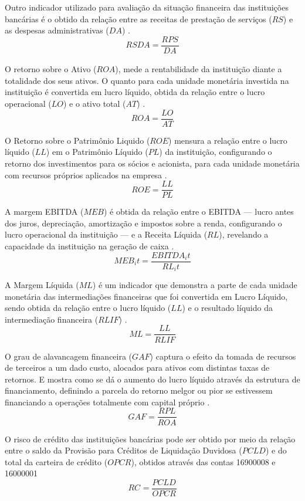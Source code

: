 \documentclass[12pt,12pt,openright,oneside,a4paper,chapter=TITLE,section=TITLE,subsection=TITLE,subsubsection=TITLE,english,french,spanish,portugues,sumario=tradicional]{abntex2}
\begin{document}
Outro indicador utilizado para avaliação da situação financeira das instituições bancárias é o obtido da relação entre as receitas de prestação de serviços (\(RS\)) e as despesas administrativas (\(DA\)) \cite{dantas:2012}.
\[
RSDA = \frac{RPS_{}}{DA_{}}
\]

O retorno sobre o Ativo (\(ROA\)), mede a rentabilidade da instituição diante a totalidade dos seus ativos. O quanto para cada unidade monetária investida na instituição é convertida em lucro líquido, obtida da relação entre o lucro operacional (\(LO\)) e o ativo total (\(AT\)) \cite{assaf:2020}.\\
\[
ROA = \frac{LO}{AT}
\]

O Retorno sobre o Patrimônio Liquido (\(ROE\)) mensura a relação entre o lucro líquido (\(LL\)) em o Patrimônio Líquido (\(PL\)) da instituição, configurando o retorno dos investimentos para os sócios e acionista, para cada unidade monetária com recursos próprios aplicados na empresa \cite{assaf:2020}.\\
\[
ROE = \frac{LL}{PL}
\]

A margem EBITDA (\(MEB\)) é obtida da relação entre o EBITDA --- lucro antes dos juros, depreciação, amortização e impostos sobre a renda, configurando o lucro operacional da instituição --- e a Receita Líquida (\(RL\)), revelando a capacidade da instituição na geração de caixa \cite{assaf:2020}.
\[
MEB_it = \frac{EBITDA_it}{RL_it}
\]

A Margem Líquida (\(ML\)) é um indicador que demonstra a parte de cada unidade monetária das intermediações financeiras que foi convertida em Lucro Líquido, sendo obtida da relação entre o lucro líquido (\(LL\)) e o resultado líquido da intermediação financeira (\(RLIF\)) \cite{assaf:2020}.
\[
ML = \frac{LL}{RLIF}
\]

O grau de alavancagem financeira (\(GAF\)) captura o efeito da tomada de recursos de terceiros a um dado custo, alocados para ativos com distintas taxas de retornos. E mostra como se dá o aumento do lucro líquido através da estrutura de financiamento, definindo a parcela do retorno melgor ou pior se estivessem financiando a operações totalmente com capital próprio \cite{assaf:2020}.
\[
GAF = \frac{RPL}{ROA}
\]

O risco de crédito das instituições bancárias pode ser obtido por meio da relação entre o saldo da Provisão para Créditos de Liquidação Duvidosa (\(PCLD\)) e do total da carteira de crédito (\(OPCR\)), obtidos através das contas 16900008 e 16000001 \cite{dantas:2012}
\[
RC_{} = \frac{PCLD_{}}{OPCR_{}}
\]
\end{document}

